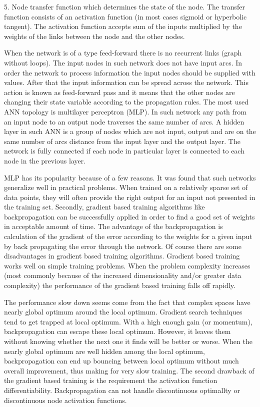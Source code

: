 \documentclass{llncs}
\begin{document}
5. Node transfer function which determines the state of the node. The transfer function consists of an activation function (in most cases sigmoid or hyperbolic tangent). The activation function accepts sum of the inputs multiplied by the weights of the links between the node and the other nodes.

When the network is of a type feed-forward there is no recurrent links (graph without loops). The input nodes in such network does not have input arcs. In order the network to process information the input nodes should be supplied with values. After that the input information can be spread across the network. This action is known as feed-forward pass and it means that the other nodes are changing their state variable according to the propagation rules. The most used ANN topology is multilayer perceptron (MLP). In such network any path from an input node to an output node traverses the same number of arcs. A hidden layer in such ANN is a group of nodes which are not input, output and are on the same number of arcs distance from the input layer and the output layer. The network is fully connected if each node in particular layer is connected to each node in the previous layer. 

MLP has its popularity because of a few reasons. It was found that such networks generalize well in practical problems. When trained on a relatively sparse set of data points, they will often provide the right output for an input not presented in the training set. Secondly, gradient based training algorithms like backpropagation can be successfully applied in order to find a good set of weights in acceptable amount of time. The advantage of the backpropagation is calculation of the gradient of the error according to the weights for a given input by back propagating the error through the network. Of course there are some disadvantages in gradient based training algorithms. Gradient based training works well on simple training problems. When the problem complexity increases (most commonly because of the increased dimensionality and/or greater data complexity) the performance of the gradient based training falls off rapidly. 

The performance slow down seems come from the fact that complex spaces have nearly global optimum around the local optimum. Gradient search techniques tend to get trapped at local optimum. With a high enough gain (or momentum), backpropagation can escape these local optimum. However, it leaves them without knowing whether the next one it finds will be better or worse. When the nearly global optimum are well hidden among the local optimum, backpropagation can end up bouncing between local optimum without much overall improvement, thus making for very slow training. The second drawback of the gradient based training is the requirement the activation function differentiability. Backpropagation can not handle discontinuous  optimallty or discontinuous node activation functions.
%
\end{document}
